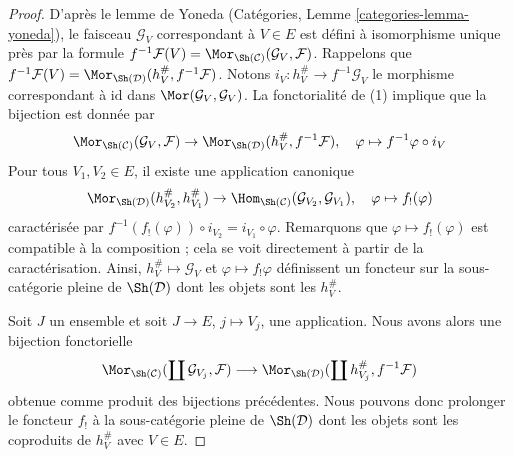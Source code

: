 \begin{proof}
D’après le lemme de Yoneda (Catégories, Lemme
\ref{categories-lemma-yoneda}), le faisceau $\mathcal{G}_V$
correspondant à $V \in E$ est défini à isomorphisme unique près par la formule
$f^{-1}\mathcal{F}(V) =
\Mor_{\Sh(\mathcal{C})}(\mathcal{G}_V, \mathcal{F})$.
Rappelons que
$f^{-1}\mathcal{F}(V) =
\Mor_{\Sh(\mathcal{D})}(h_V^\#, f^{-1}\mathcal{F})$.
Notons $i_V : h_V^\# \to f^{-1}\mathcal{G}_V$ le morphisme correspondant à
$\text{id}$ dans $\Mor(\mathcal{G}_V, \mathcal{G}_V)$.
La fonctorialité de (1) implique que la bijection est donnée par
$$
\Mor_{\Sh(\mathcal{C})}(\mathcal{G}_V, \mathcal{F}) \to
\Mor_{\Sh(\mathcal{D})}(h_V^\#, f^{-1}\mathcal{F}),\quad
\varphi \mapsto f^{-1}\varphi \circ i_V
$$
Pour tous $V_1, V_2 \in E$, il existe une application canonique
$$
\Mor_{\Sh(\mathcal{D})}(h^\#_{V_2}, h^\#_{V_1})
\to
\Hom_{\Sh(\mathcal{C})}(\mathcal{G}_{V_2}, \mathcal{G}_{V_1}),\quad
\varphi \mapsto f_!(\varphi)
$$
caractérisée par
$f^{-1}(f_!(\varphi)) \circ i_{V_2} = i_{V_1} \circ \varphi$.
Remarquons que $\varphi \mapsto f_!(\varphi)$ est compatible à la composition ;
cela se voit directement à partir de la caractérisation.
Ainsi, $h_V^\# \mapsto \mathcal{G}_V$ et
$\varphi \mapsto f_!\varphi$ définissent un foncteur sur la sous-catégorie
pleine de $\Sh(\mathcal{D})$ dont les objets sont les $h_V^\#$.

\medskip\noindent
Soit $J$ un ensemble et soit $J \to E$, $j \mapsto V_j$, une application.
Nous avons alors une bijection fonctorielle
$$
\Mor_{\Sh(\mathcal{C})}(\coprod \mathcal{G}_{V_j}, \mathcal{F})
\longrightarrow
\Mor_{\Sh(\mathcal{D})}(\coprod h_{V_j}^\#, f^{-1}\mathcal{F})
$$
obtenue comme produit des bijections précédentes. Nous pouvons donc prolonger
le foncteur $f_!$ à la sous-catégorie pleine de $\Sh(\mathcal{D})$
dont les objets sont les coproduits de $h_V^\#$ avec $V \in E$.


\end{proof}

